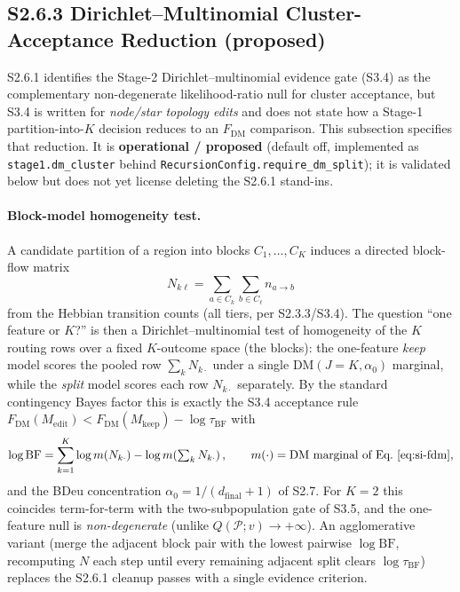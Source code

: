 \documentclass[11pt]{article}
\begin{document}
\subsection*{S2.6.3 Dirichlet--Multinomial Cluster-Acceptance Reduction (proposed)}
\label{sec:si-dm-cluster-reduction}
S2.6.1 identifies the Stage-2 Dirichlet--multinomial evidence gate (S3.4) as the
complementary non-degenerate likelihood-ratio null for cluster acceptance, but
S3.4 is written for \emph{node/star topology edits} and does not state how a
Stage-1 partition-into-$K$ decision reduces to an $F_{\mathrm{DM}}$ comparison.
This subsection specifies that reduction. It is \textbf{operational / proposed}
(default off, implemented as \texttt{stage1.dm\_cluster} behind
\texttt{RecursionConfig.require\_dm\_split}); it is validated below but does not
yet license deleting the S2.6.1 stand-ins.

\paragraph{Block-model homogeneity test.} A candidate partition of a region into
blocks $C_1,\dots,C_K$ induces a directed block-flow matrix
\[
N_{k\ell}=\sum_{a\in C_k}\sum_{b\in C_\ell} n_{a\to b}
\]
from the Hebbian transition counts (all tiers, per S2.3.3/S3.4). The question
``one feature or $K$?'' is then a Dirichlet--multinomial test of homogeneity of
the $K$ routing rows over a fixed $K$-outcome space (the blocks): the
one-feature \emph{keep} model scores the pooled row $\sum_k N_{k\cdot}$ under a
single $\mathrm{DM}(J{=}K,\alpha_0)$ marginal, while the \emph{split} model
scores each row $N_{k\cdot}$ separately. By the standard contingency Bayes
factor this is exactly the S3.4 acceptance rule $F_{\mathrm{DM}}(M_{\mathrm{edit}})
< F_{\mathrm{DM}}(M_{\mathrm{keep}}) - \log\tau_{\mathrm{BF}}$ with
\[
\log \mathrm{BF}
=\sum_{k=1}^{K}\log m\!\left(N_{k\cdot}\right)-\log m\!\left(\textstyle\sum_k N_{k\cdot}\right),
\qquad
m(\cdot)=\text{$\mathrm{DM}$ marginal of Eq.~\eqref{eq:si-fdm}},
\]
and the BDeu concentration $\alpha_0=1/(d_{\mathrm{final}}+1)$ of S2.7. For
$K{=}2$ this coincides term-for-term with the two-subpopulation gate of S3.5,
and the one-feature null is \emph{non-degenerate} (unlike $Q(\mathcal P;v)\to+\infty$).
An agglomerative variant (merge the adjacent block pair with the lowest pairwise
$\log\mathrm{BF}$, recomputing $N$ each step until every remaining adjacent split
clears $\log\tau_{\mathrm{BF}}$) replaces the S2.6.1 cleanup passes with a single
evidence criterion.
\end{document}
